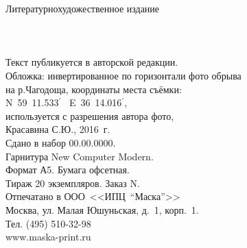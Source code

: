 {
\newpage
\thispagestyle{empty}
\begin{center}
{\small Литературно\sdash художественное издание}\\
\vspace{1.6cm}
{\Large \MyVarAuthorName}\\
\vspace{1.6cm}
{\Large\textbf\MyVarBookName}\\
\vspace{0.4cm}
{\Large\textbf\MyVarBookNamesec}\\
\vspace{1.0cm}
{\small%
Текст публикуется в авторской редакции.\\
\vspace{1.0cm}
Обложка: инвертированное по горизонтали фото обрыва\\
на р.Чагодоща, координаты места съёмки:\\N~59\degree~11.533$^\prime$~ E~36\degree~14.016$^\prime$,\\используется с разрешения автора фото,\\ Красавина С.Ю., 2016~г.\\
\vspace{1.5cm}
Сдано в набор 00.00.0000.\\
Гарнитура New Computer Modern.\\
Формат А5. Бумага офсетная.\\
Тираж 20 экземпляров. Заказ N.\\
\vspace{1.0cm}
Отпечатано в ООО~<<ИПЦ~"`Маска"'>>\\
Москва, ул. Малая Юшуньская, д.~1, корп.~1.\\
Тел. (495) 510-32-98\\
www.maska-print.ru
}
\end{center}
}